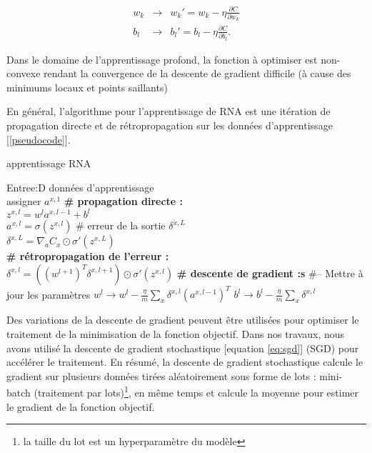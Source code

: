 \begin{eqnarray} 
\label{eq:descente}
w_k & \rightarrow & w_k' = w_k-\eta \frac{\partial C}{\partial w_k} \\ b_l & \rightarrow & b_l' = b_l-\eta \frac{\partial C}{\partial b_l}. \end{eqnarray}


Dans le domaine de l'apprentissage profond, la fonction à optimiser est non-convexe  rendant la convergence de la descente de gradient difficile (à cause des minimums locaux et points saillants)

En général, l'algorithme pour l'apprentissage de RNA est une itération de propagation directe et de rétropropagation sur les données d'apprentissage [\ref{pseudocode}].\\

\begin{algorithm}
\label{pseudocode}
\caption{apprentissage RNA}
\begin{algorithmic}
\STATE Entree:D données d'apprentissage\\
\STATE assigner $a^{x,1}$
\ENDWHILE
\STATE \textbf{\# propagation directe :}\\
\STATE$z^{x,l} = w^l a^{x,l-1}+b^l$\\
\STATE$a^{x,l} = \sigma(z^{x,l})$
\ENDFOR
\STATE \# erreur de la sortie $\delta^{x,L}$\\
\STATE $\delta^{x,L} = \nabla_a C_x \odot \sigma'(z^{x,L})$\\
\STATE \textbf{\# rétropropagation de l'erreur :}\\
\STATE $\delta^{x,l} = ((w^{l+1})^T \delta^{x,l+1}) \odot \sigma'(z^{x,l})$
\ENDFOR
\STATE \textbf{\# descente de gradient :s}
\STATE \#-- Mettre à jour les paramètres
\STATE $w^l \rightarrow w^l-\frac{\eta}{m} \sum_x \delta^{x,l} (a^{x,l-1})^T$
\STATE $b^l \rightarrow b^l-\frac{\eta}{m} \sum_x \delta^{x,l}$
\ENDFOR

\end{algorithmic}
\end{algorithm}

\qquad Des variations de la descente de gradient peuvent être utilisées pour optimiser le traitement de la minimisation de la fonction objectif. Dans nos travaux, nous avons utilisé la descente de gradient stochastique [equation \ref{eq:sgd}] (SGD) pour accélérer le traitement. En résumé, la descente de gradient stochastique calcule le gradient  sur plusieurs données tirées aléatoirement sous forme de lots : mini-batch (traitement par lots)\footnote{la taille du lot est un hyperparamètre du modèle}, en même temps et calcule la moyenne pour estimer le gradient de la fonction objectif.\\

